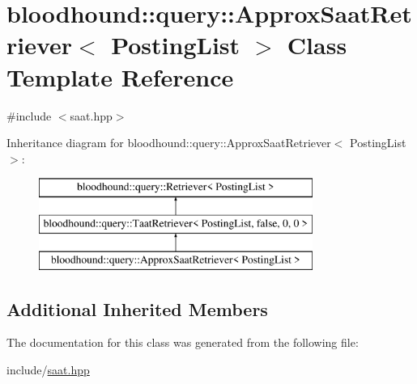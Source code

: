 \hypertarget{classbloodhound_1_1query_1_1ApproxSaatRetriever}{}\section{bloodhound\+:\+:query\+:\+:Approx\+Saat\+Retriever$<$ Posting\+List $>$ Class Template Reference}
\label{classbloodhound_1_1query_1_1ApproxSaatRetriever}


{\ttfamily \#include $<$saat.\+hpp$>$}

Inheritance diagram for bloodhound\+:\+:query\+:\+:Approx\+Saat\+Retriever$<$ Posting\+List $>$\+:\begin{figure}[H]
\begin{center}
\leavevmode
\includegraphics[height=3.000000cm]{classbloodhound_1_1query_1_1ApproxSaatRetriever}
\end{center}
\end{figure}
\subsection*{Additional Inherited Members}


The documentation for this class was generated from the following file\+:\begin{DoxyCompactItemize}
\item 
include/\hyperlink{saat_8hpp}{saat.\+hpp}\end{DoxyCompactItemize}
